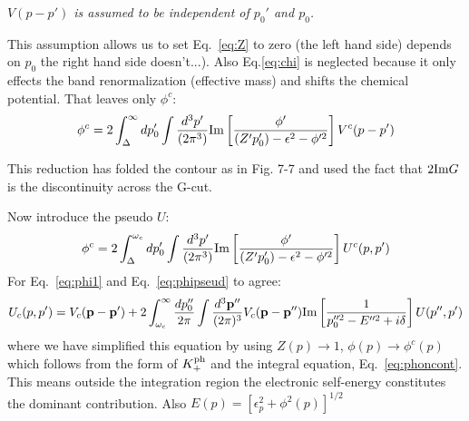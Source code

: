 \documentclass{article}
\def\p{{\bf p}}
\begin{document}
\emph{$V(p-p')$ is assumed to be independent of $p_0'$ and $p_0$.}

This assumption allows us to set Eq.~\ref{eq:Z} 
to zero (the left hand side)  depends on $p_0$ the right hand side doesn't...).
Also Eq.\ref{eq:chi} is neglected because it only effects the 
band renormalization (effective mass) and shifts the chemical potential.
That leaves only $\phi^{c}$:
%
\begin{equation}
\label{eq:phi1}
\phi^{c} = 2 \int_{\Delta}^{\infty}dp_{0}' \int \frac{d^{3}p'}{(2\pi^{3})} {\rm Im} \left[ \frac{\phi'}{(Z'p_{0}') - \epsilon^{2} -\phi'^{2}} 
\right]V^{c}(p-p')
\end{equation}

This reduction has folded the contour as in Fig. 7-7 and used the fact that $2{\rm Im} G$ is the discontinuity across the G-cut. 

Now introduce the pseudo $U$:
%
\begin{equation}
\label{eq:phipseud}
\phi^{c} = 2 \int_{\Delta}^{\omega_c}dp_{0}' \int \frac{d^{3}p'}{(2\pi^{3})} {\rm Im} \left[ \frac{\phi'}{(Z'p_{0}') - \epsilon^{2} -\phi'^{2}} 
\right]U^{c}(p,p')
\end{equation}
%
For Eq.~\ref{eq:phi1} and Eq.~\ref{eq:phipseud} to agree:
%
\begin{equation}
\label{eq:upseudo}
U_{c}(p,p') = V_{c}(\p-\p') + 2 \int_{\omega_{c}}^{\infty}\frac{dp_{0}''}{2\pi}\int \frac{d^{3}\p''}{(2\pi)^{3}}V_{c}(\p-\p'') {\rm Im}
\left[ \frac{1}{p_{0}''^{2} - E''^{2} +i\delta} \right] U(p'',p')
\end{equation}
%
where we have simplified this equation by using $Z(p) \rightarrow 1$, $\phi(p) \rightarrow \phi^{c}(p)$ which follows from the form 
of $K_{+}^{\rm ph}$ and the integral equation, Eq.~\ref{eq:phoncont}. This means outside the integration 
region the electronic self-energy constitutes the dominant contribution. Also $E(p) = [\epsilon^{2}_{p} + \phi^{2}(p)]^{1/2}$
\end{document}
